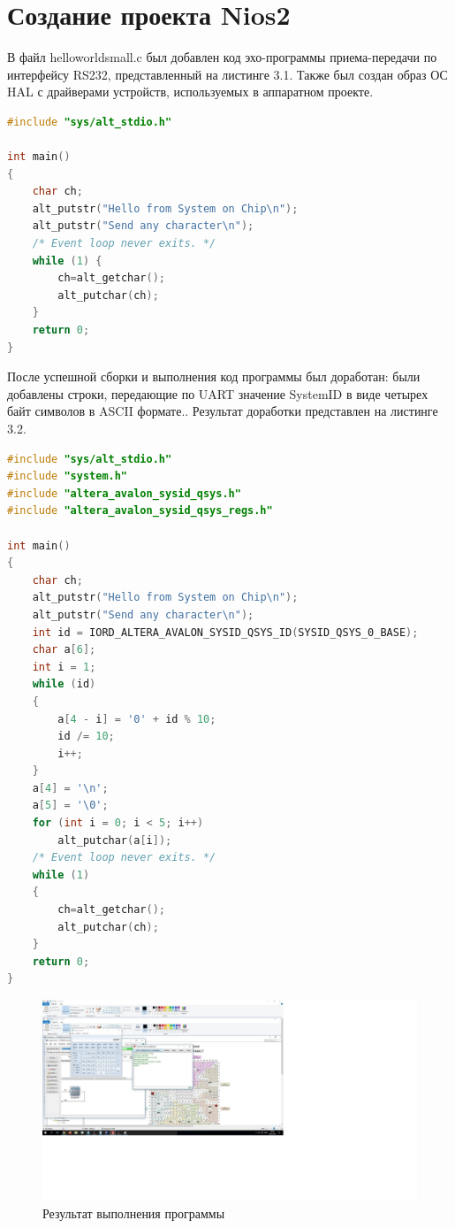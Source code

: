 \documentclass[12pt]{report}
\begin{document}
\section{Создание проекта Nios2}
В файл helloworldsmall.c был добавлен код эхо-программы приема-передачи по интерфейсу RS232, представленный на листинге 3.1. Также был создан образ ОС HAL с драйверами устройств, используемых в аппаратном проекте. \begin{lstlisting}[label=some-code,caption=Функция нахождения расстояния Левенштейна рекурсивно,language=C++]
#include "sys/alt_stdio.h"

int main()
{
    char ch;
    alt_putstr("Hello from System on Chip\n");
    alt_putstr("Send any character\n");
    /* Event loop never exits. */
    while (1) { 
        ch=alt_getchar();
        alt_putchar(ch);
    }
    return 0; 
}
\end{lstlisting}
После успешной сборки и выполнения код программы был доработан: были добавлены строки, передающие по UART значение SystemID в виде четырех байт символов в ASCII формате.. Результат доработки представлен на листинге 3.2.
\begin{lstlisting}[label=some-code,caption=Функция нахождения расстояния Левенштейна рекурсивно,language=C++]
#include "sys/alt_stdio.h"
#include "system.h"
#include "altera_avalon_sysid_qsys.h"
#include "altera_avalon_sysid_qsys_regs.h"

int main()
{
    char ch;
    alt_putstr("Hello from System on Chip\n");
    alt_putstr("Send any character\n");
    int id = IORD_ALTERA_AVALON_SYSID_QSYS_ID(SYSID_QSYS_0_BASE);
    char a[6];
    int i = 1;
    while (id)
    {
        a[4 - i] = '0' + id % 10;
        id /= 10;
        i++;
    }
    a[4] = '\n';
    a[5] = '\0';
    for (int i = 0; i < 5; i++)
        alt_putchar(a[i]);
    /* Event loop never exits. */
    while (1) 
    {
        ch=alt_getchar();
        alt_putchar(ch);
    }
    return 0;
}
\end{lstlisting}

\begin{figure}[hp!]
    \centering
    \includegraphics{report_files/jopa.png}
    \caption{Результат выполнения программы}
    \label{fig:my_label4}
\end{figure}
\end{document}

